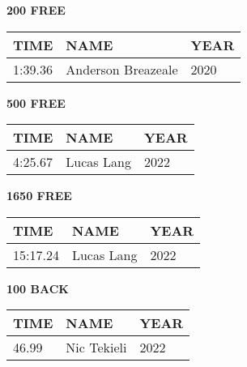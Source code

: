 \begin{minipage}[t]{0.48\textwidth}
\centering
\textbf{200 FREE}\\[0.05cm]
\begin{tabular}{@{}p{1.8cm}p{2.8cm}p{1.2cm}@{}}
\hline
\textbf{TIME} & \textbf{NAME} & \textbf{YEAR} \\
\hline
1:39.36 & Anderson Breazeale & 2020 \\
\hline
\end{tabular}
\end{minipage}\hfill
\begin{minipage}[t]{0.48\textwidth}
\centering
\textbf{500 FREE}\\[0.05cm]
\begin{tabular}{@{}p{1.8cm}p{2.8cm}p{1.2cm}@{}}
\hline
\textbf{TIME} & \textbf{NAME} & \textbf{YEAR} \\
\hline
4:25.67 & Lucas Lang & 2022 \\
\hline
\end{tabular}
\end{minipage}

\vspace{0.4cm}

\begin{minipage}[t]{0.48\textwidth}
\centering
\textbf{1650 FREE}\\[0.05cm]
\begin{tabular}{@{}p{1.8cm}p{2.8cm}p{1.2cm}@{}}
\hline
\textbf{TIME} & \textbf{NAME} & \textbf{YEAR} \\
\hline
15:17.24 & Lucas Lang & 2022 \\
\hline
\end{tabular}
\end{minipage}\hfill
\begin{minipage}[t]{0.48\textwidth}
\centering
\textbf{100 BACK}\\[0.05cm]
\begin{tabular}{@{}p{1.8cm}p{2.8cm}p{1.2cm}@{}}
\hline
\textbf{TIME} & \textbf{NAME} & \textbf{YEAR} \\
\hline
46.99 & Nic Tekieli & 2022 \\
\hline
\end{tabular}
\end{minipage}

\vspace{0.4cm}


